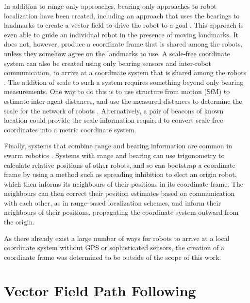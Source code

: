In addition to range-only approaches, bearing-only approaches to robot localization have been created, including an approach that uses the bearings to landmarks to create a vector field to drive the robot to a goal \citep{loizou2007biologically}. 
This approach is even able to guide an individual robot in the presence of moving landmarks. 
It does not, however, produce a coordinate frame that is shared among the robots, unless they somehow agree on the landmarks to use. 
A scale-free coordinate system can also be created using only bearing sensors and inter-robot communication, to arrive at a coordinate system that is shared among the robots \citep{cornejo2013scale}.
The addition of scale to such a system requires something beyond only bearing measurements. 
One way to do this is to use structure from motion (SfM) to estimate inter-agent distances, and use the measured distances to determine the scale for the network of robots \citep{spica2016active}. 
Alternatively, a pair of beacons of known location could provide the scale information required to convert scale-free coordinates into a metric coordinate system. 

Finally, systems that combine range and bearing information are common in swarm robotics \citep{caprari1998autonomous, mondada2009puck, arvin2009development, farrow2014miniature}. 
Systems with range and bearing can use trigonometry to calculate relative positions of other robots, and so can bootstrap a coordinate frame by using a method such as spreading inhibition to elect an origin robot, which then informs its neighbours of their positions in its coordinate frame. The neighbours can then correct their position estimates based on communication with each other, as in range-based localization schemes, and inform their neighbours of their positions, propagating the coordinate system outward from the origin. 

As there already exist a large number of ways for robots to arrive at a local coordinate system without GPS or sophisticated sensors, the creation of a coordinate frame was determined to be outside of the scope of this work. 

\section{Vector Field Path Following}

